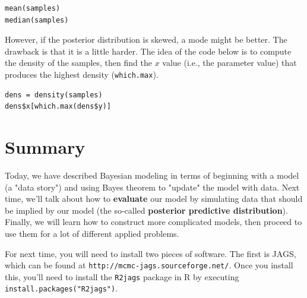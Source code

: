 \documentclass[11pt]{article}
\begin{document}
\begin{verbatim}
mean(samples)
median(samples)
\end{verbatim}

However, if the posterior distribution is skewed, a mode might be better.  The drawback is that it is a little harder.  The idea of the code below is to compute the density of the samples, then find the $x$ value (i.e., the parameter value) that produces the highest density (\texttt{which.max}).

\begin{verbatim}
dens = density(samples)
dens$x[which.max(dens$y)]
\end{verbatim}

\section*{Summary}
\label{sec-7}
Today, we have described Bayesian modeling in terms of beginning with a model (a "data story") and using Bayes theorem to "update" the model with data.  Next time, we'll talk about how to \textbf{evaluate} our model by simulating data that should be implied by our model (the so-called \textbf{posterior predictive distribution}).  Finally, we will learn how to construct more complicated models, then proceed to use them for a lot of different applied problems.

For next time, you will need to install two pieces of software.  The first is JAGS, which can be found at \texttt{http://mcmc-jags.sourceforge.net/}.  Once you install this, you'll need to install the \texttt{R2jags} package in R by executing \texttt{install.packages("R2jags")}.
\end{document}

